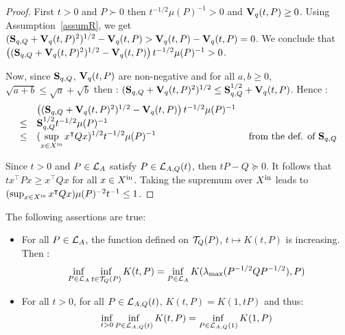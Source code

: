 \documentclass[10pt]{article}
\begin{document}
\begin{proof}
First $t>0$ and $P\succ 0$ then $t^{-1/2}\mu(P)^{-1}>0$ and $\mathbf{V}_{q}(t,P)\geq 0$. Using Assumption~\ref{assumR}, we get $(\mathbf{S}_{q,Q}+\mathbf{V}_{q}(t,P)^2)^{1/2}-\mathbf{V}_{q}(t,P)> \mathbf{V}_{q}(t,P)-\mathbf{V}_{q}(t,P)=0$. We conclude that $\left((\mathbf{S}_{q,Q}+\mathbf{V}_{q}(t,P)^2)^{1/2}-\mathbf{V}_{q}(t,P)\right) t^{-1/2}\mu(P)^{-1}>0$. 

Now, since $\mathbf{S}_{q,Q}$, $\mathbf{V}_{q}(t,P)$ are non-negative and for all $a,b\geq 0$, $\sqrt{a+b}\leq \sqrt{a}+\sqrt{b}$  then : 
$(\mathbf{S}_{q,Q}+\mathbf{V}_{q}(t,P)^2)^{1/2}\leq \mathbf{S}_{q,Q}^{1/2}+\mathbf{V}_{q}(t,P)$. Hence : 
\[
\begin{array}{lll}
&\left((\mathbf{S}_{q,Q}+\mathbf{V}_{q}(t,P)^2)^{1/2}-\mathbf{V}_{q}(t,P)\right) t^{-1/2}\mu(P)^{-1}& \\
\leq &\mathbf{S}_{q,Q}^{1/2} t^{-1/2}\mu(P)^{-1} & \\
\leq &(\displaystyle{\sup_{x\in X^\mathrm{in}} x^\intercal Q x})^{1/2} t^{-1/2}\mu(P)^{-1} & \text{ from the def. of } \mathbf{S}_{q,Q}
\end{array}
\]

Since $t>0$ and $P\in\mathcal{L}_{A}$ satisfy $P\in\mathcal{L}_{A,Q}(t)$, then $t P-Q\succeq 0$. It follows that 
$t x^\intercal P x\geq x^\intercal Q x$ for all $x\in X^\mathrm{in}$. Taking the supremum over $X^\mathrm{in}$ leads to $(\sup_{x\in X^\mathrm{in}} x^\intercal Q x)\mu(P)^{-2}t^{-1} \leq 1$. 
\end{proof}

\begin{prop}
The following assertions are true:
\begin{itemize}
\item For all $P\in\mathcal{L}_{A}$, the function defined on $\mathcal{T}_{Q}(P)$, $t\mapsto K(t,P)$ is increasing. Then : 
\begin{equation}
\label{infsolved}
\inf_{P\in\mathcal{L}_{A}} \inf_{t\in\mathcal{T}_{Q}(P)} K(t,P)=\inf_{P\in\mathcal{L}_{A}}K(\lambda_{\operatorname{max}}(P^{-1/2} Q P^{-1/2}),P)
\end{equation}
\item For all $t>0$, for all $P\in\mathcal{L}_{A,Q}(t)$, $K(t,P)=K(1,tP)$ and thus:
\[
\inf_{t>0} \inf_{P\in\mathcal{L}_{A,Q}(t)} K(t,P)=\inf_{P\in\mathcal{L}_{A,Q}(1)} K(1,P)
\]
\end{itemize}
\end{prop}
\end{document}
